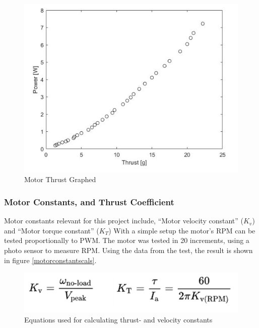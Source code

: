 \begin{figure}[H]
\begin{center}
   \includegraphics[scale =1]{pictures/control/Graph thrust.JPG}
\end{center}
\caption{Motor Thrust Graphed}
\label{motorthrustgraphed}
\end{figure}

\subsubsection{Motor Constants, and Thrust Coefficient}
Motor constants relevant for this project include, “Motor velocity constant” ($K_v$) and “Motor torque constant” ($K_T$)
With a simple setup the motor's RPM can be tested proportionally to PWM. The motor was tested in 20 increments, using a photo sensor to measure RPM. Using the data from the test, the result is shown in figure \ref{motorconstantscals}. \cite{MotorConstants}

\begin{figure}[H]
\begin{center}
   \includegraphics[scale =1]{pictures/control/Motor constants theory.png}
\end{center}
\caption{Equations used for calculating thrust- and velocity constants}
\end{figure}

